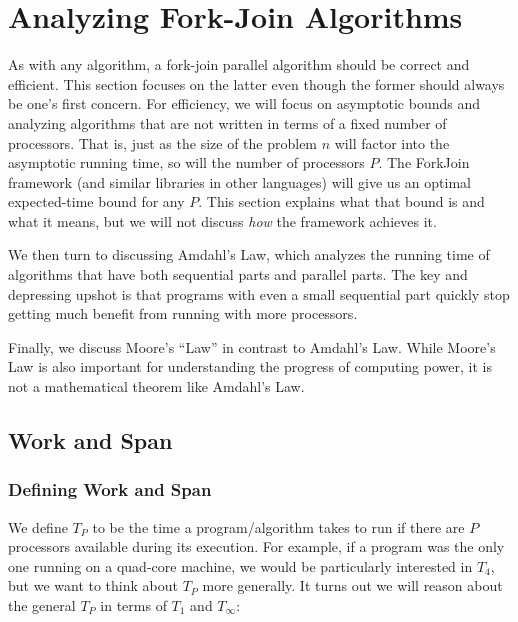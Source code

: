 \documentclass[10pt]{article}
\begin{document}
\section{Analyzing Fork-Join Algorithms}
\label{sec:analyze-fork-join}

As with any algorithm, a fork-join parallel algorithm should be
correct and efficient.  This section focuses on the latter even though
the former should always be one's first concern.  For efficiency, we
will focus on asymptotic bounds and analyzing algorithms that are not
written in terms of a fixed number of processors.  That is, just as
the size of the problem $n$ will factor into the asymptotic running
time, so will the number of processors $P$.  The ForkJoin framework
(and similar libraries in other languages) will give us an optimal
expected-time bound for any $P$.  This section explains what that
bound is and what it means, but we will not discuss \emph{how} the
framework achieves it.  

We then turn to discussing Amdahl's Law, which analyzes the running
time of algorithms that have both sequential parts and parallel parts.
The key and depressing upshot is that programs with even a small
sequential part quickly stop getting much benefit from running with
more processors.

Finally, we discuss Moore's ``Law'' in contrast to Amdahl's Law.
While Moore's Law is also important for understanding the progress of
computing power, it is not a mathematical theorem like Amdahl's Law.

\subsection{Work and Span}

\subsubsection{Defining Work and Span}

We define $T_P$ to be the time a program/algorithm takes to run if
there are $P$ processors available during its execution.  For example,
if a program was the only one running on a quad-core machine, we would
be particularly interested in $T_4$, but we want to think about $T_P$
more generally.  It turns out we will reason about the general $T_P$
in terms of $T_1$ and $T_\infty$:
\end{document}
